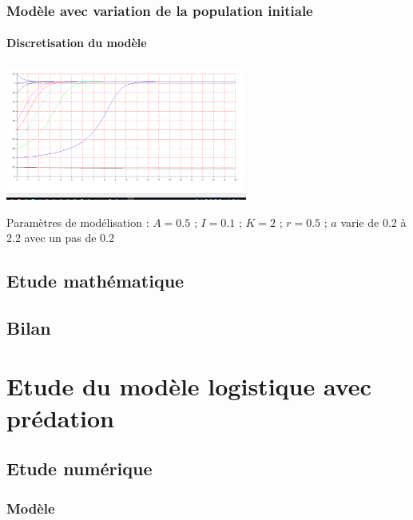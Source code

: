 \documentclass{article}
\begin{document}
\subsubsection{Modèle avec variation de la population initiale}

\paragraph{Discretisation du modèle}
\begin{center}
\includegraphics[width=300px]{img/part1/TrajPop.png}
\end{center}
Paramètres de modélisation : $A=0.5$ ; $I=0.1$ ; $K=2$ ; $r=0.5$  ; $a$ varie de 0.2 à 2.2 avec un pas de 0.2
\paragraph{}

\newpage

\subsection{Etude mathématique}


\subsection{Bilan}
\paragraph{}

\newpage
\section{Etude du modèle logistique avec prédation}

\subsection{Etude numérique}

\subsubsection{Modèle}
\end{document}
